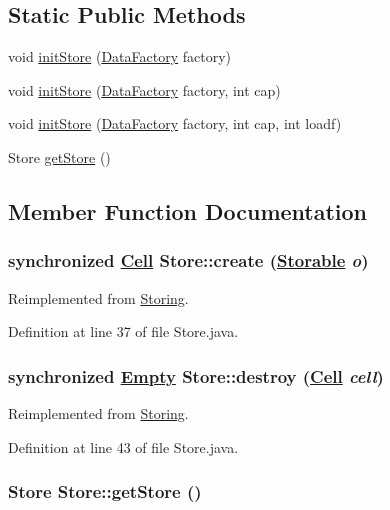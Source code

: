 \subsection*{Static Public Methods}
\begin{CompactItemize}
\item 
void \hyperlink{classStore_d0}{init\-Store} (\hyperlink{interfaceDataFactory}{Data\-Factory} factory)
\item 
void \hyperlink{classStore_d1}{init\-Store} (\hyperlink{interfaceDataFactory}{Data\-Factory} factory, int cap)
\item 
void \hyperlink{classStore_d2}{init\-Store} (\hyperlink{interfaceDataFactory}{Data\-Factory} factory, int cap, int loadf)
\item 
Store \hyperlink{classStore_d3}{get\-Store} ()
\end{CompactItemize}


\subsection{Member Function Documentation}
\hypertarget{classStore_a0}{
\subsubsection[create]{\setlength{\rightskip}{0pt plus 5cm}synchronized \hyperlink{interfaceCell}{Cell} Store::create (\hyperlink{interfaceStorable}{Storable} {\em o})}}
\label{classStore_a0}




Reimplemented from \hyperlink{interfaceStoring_a0}{Storing}.

Definition at line 37 of file Store.java.\hypertarget{classStore_a1}{
\subsubsection[destroy]{\setlength{\rightskip}{0pt plus 5cm}synchronized \hyperlink{interfaceEmpty}{Empty} Store::destroy (\hyperlink{interfaceCell}{Cell} {\em cell})}}
\label{classStore_a1}




Reimplemented from \hyperlink{interfaceStoring_a1}{Storing}.

Definition at line 43 of file Store.java.\hypertarget{classStore_d3}{
\subsubsection[getStore]{\setlength{\rightskip}{0pt plus 5cm}Store Store::get\-Store ()}}
\label{classStore_d3}




